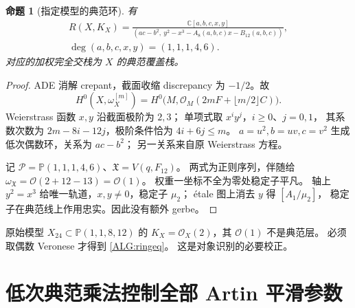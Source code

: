 \documentclass[UTF8,fontset=fandol,zihao=-4,oneside,openany]{ctexbook}
\theoremstyle{cjkplain}
\newtheorem{proposition}[theorem]{命题}
\numberwithin{equation}{chapter}
\begin{document}
\begin{proposition}[指定模型的典范环]
\label{ALG:ring}
有
\begin{equation}
\begin{gathered}
R(X,K_X)=
\frac{\mathbb C[a,b,c,x,y]}
{(ac-b^2,\ y^2-x^3-A_8(a,b,c)x-B_{12}(a,b,c))},\\
\deg(a,b,c,x,y)=(1,1,1,4,6).
\end{gathered}
\label{ALG:ringeq}
\end{equation}
对应的加权完全交栈为 $X$ 的典范覆盖栈。
\end{proposition}
\begin{proof}
ADE 消解 crepant，截面收缩 discrepancy 为 $-1/2$。故
\begin{equation}
H^0(X,\omega_X^{[m]})
=
H^0\bigl(M,\mathcal O_M(2mF+\lfloor m/2\rfloor C)\bigr).
\label{ALG:floor}
\end{equation}
Weierstrass 函数 $x,y$ 沿截面极阶为 $2,3$；
单项式取 $x^iy^j$，$i\ge0$、$j=0,1$，
其系数次数为 $2m-8i-12j$，极阶条件恰为 $4i+6j\le m$。
$a=u^2,b=uv,c=v^2$ 生成低次偶数环，关系为 $ac-b^2$；
另一关系来自原 Weierstrass 方程。

记 $\mathcal P=\mathbb P(1,1,1,4,6)$、$\mathfrak X=V(q,F_{12})$。
两式为正则序列，伴随给
$\omega_{\mathfrak X}=\mathcal O(2+12-13)=\mathcal O(1)$。
权重一坐标不全为零处稳定子平凡。
轴上 $y^2=x^3$ 给唯一轨道，$x,y\ne0$，稳定子 $\mu_2$；
étale 图上消去 $y$ 得 $[A_1/\mu_2]$，
稳定子在典范线上作用忠实。因此没有额外 gerbe。
\end{proof}

原始模型 $X_{24}\subset\mathbb P(1,1,8,12)$ 的
$K_X=\mathcal O_X(2)$，其 $\mathcal O(1)$ 不是典范层。
必须取偶数 Veronese 才得到 \eqref{ALG:ringeq}。
这是对象识别的必要校正。

\section{低次典范乘法控制全部 Artin 平滑参数}
\end{document}
